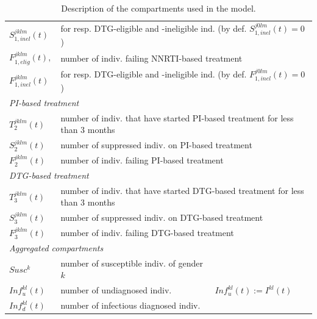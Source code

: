 \documentclass{article}
\begin{document}
\begin{table}[h!]
{\begin{tabular}{lll}
		$S_{1,inel}^{jklm}(t)$& \multicolumn{2}{l}{\hspace{0.3cm} for resp. DTG-eligible and -ineligible ind. (by def. $S_{1,inel}^{j0lm}(t)=0$)}\\
		$F_{1,elig}^{jklm}(t),$ & \multicolumn{2}{l}{number of indiv. failing NNRTI-based treatment}\\
		$F_{1,inel}^{jklm}(t)$& \multicolumn{2}{l}{\hspace{0.3cm} for resp. DTG-eligible and -ineligible ind. (by def. $F_{1,inel}^{j0lm}(t)=0$)}\\[10pt]
		\multicolumn{2}{l}{\textit{PI-based treatment}}\\
		$T_2^{jklm}(t)$ & \multicolumn{2}{l}{number of indiv. that have started PI-based treatment for less than 3 months}\\
		$S_2^{jklm}(t)$ & \multicolumn{2}{l}{number of suppressed indiv. on PI-based treatment}\\
		$F_2^{jklm}(t)$ & \multicolumn{2}{l}{number of indiv. failing PI-based treatment}\\[10pt]
		\multicolumn{2}{l}{\textit{DTG-based treatment}}\\
		$T_3^{jklm}(t)$ & \multicolumn{2}{l}{number of indiv. that have started DTG-based  treatment for less than 3 months}\\
		$S_3^{jklm}(t)$ & \multicolumn{2}{l}{number of suppressed indiv. on DTG-based treatment}\\
		$F_3^{jklm}(t)$ & \multicolumn{2}{l}{number of indiv. failing DTG-based treatment}\\[10pt]
		\multicolumn{2}{l}{\textit{Aggregated compartments}}\\
		$Susc^k$ & number of susceptible indiv. of gender $k$ \\
		$Inf^{kl}_u(t)$ & number of undiagnosed indiv. & $Inf^{kl}_u(t):= I^{kl}(t)$\\
$Inf^{kl}_d(t)$ & number of infectious diagnosed indiv. &  \\
		\hline
	\end{tabular}
}
\caption{Description of the compartments used in the model.}
\label{tab8}
\end{table}
\pagebreak
\end{document}

